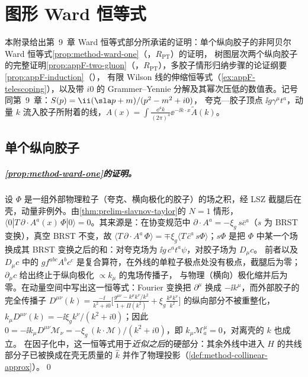 \chapter{图形 Ward 恒等式}\label{app:appF}

本附录给出第~9~章 Ward 恒等式部分所承诺的证明：单个纵向胶子的非阿贝尔 Ward 恒等式\cref{prop:method-ward-one}（\tagR，$R_{\mathrm{PT}}$）的证明，
树图层次两个纵向胶子的完整证明\cref{prop:appF-two-gluon}（\tagR，$R_{\mathrm{PT}}$），多胶子情形归纳步骤的论证纲要\cref{prop:appF-induction}（\tagA），
有限 Wilson 线的伸缩恒等式（\cref{ex:appF-telescoping}），以及带 $i0$ 的 Grammer--Yennie 分解及其幂次压低的数值表。记号同第~9~章：$S(p)=\ii(\sla p+m)/(p^2-m^2+i0)$，
夸克—胶子顶点 $\ii g\gamma^\mu t^a$，动量 $k$ 流入胶子所附着的线，$A(x)=\int\frac{\dd^4k}{(2\pi)^4}\ee^{-\ii k\cdot x}\tilde A(k)$。

\section{单个纵向胶子}\label{sec:appF-one}

\paragraph{\cref{prop:method-ward-one}的证明。}
设 $\Phi$ 是一组外部物理粒子（夸克、横向极化的胶子）的场之积，经 LSZ 截腿后在壳，动量非例外。由\cref{thm:prelim-slavnov-taylor}的 $N=1$ 情形，
$\langle0|T\,\partial\cdot A^a(x)\,\Phi|0\rangle=0$。其来源是：在协变规范中 $\partial\cdot A^a=-\xi_g\,s\bar c^a$（$s$ 为 BRST 变换），真空 BRST 不变，故
$\langle T\,\partial\cdot A^a\,\Phi\rangle=\mp\xi_g\langle T\,\bar c^a\,s\Phi\rangle$；$s\Phi$ 是把 $\Phi$ 中某一个场换成其 BRST 变换之后的和：对夸克场为 $\ii g\,c^at^a\psi$，对胶子场为 $D_\mu c$。
前者以及 $D_\mu c$ 中的 $gf^{abc}A^bc^c$ 是复合算符，在外线的单粒子极点处没有极点，截腿后为零；$\partial_\mu c$ 给出终止于纵向极化 $\propto k_\mu$ 的鬼场传播子，
与物理（横向）极化缩并后为零。在动量空间中写出这一恒等式：Fourier 变换把 $\partial^\mu$ 换成 $-\ii k^\mu$，而外部胶子的完全传播子
$D^{\mu\nu}(k)=\frac{-\ii}{k^2+i0}\bigl[\frac{g^{\mu\nu}-k^\mu k^\nu/k^2}{1+\Pi(k^2)}+\xi_g\frac{k^\mu k^\nu}{k^2}\bigr]$ 的纵向部分不被重整化，
$k_\mu D^{\mu\nu}(k)=-\ii\xi_gk^\nu/(k^2+i0)$；因此 $0=-\ii k_\mu D^{\mu\nu}\mathcal M_\nu=-\xi_g\,(k\cdot\mathcal M)/(k^2+i0)$，即 $k_\mu\mathcal M^\mu_a=0$，对离壳的 $k$ 也成立。
在因子化中，这一恒等式用于\emph{近似之后}的硬部分：其余外线中进入 $H$ 的共线部分子已被换成在壳无质量的 $\hat k$ 并作了物理投影（\cref{def:method-collinear-approx}）。\qed

